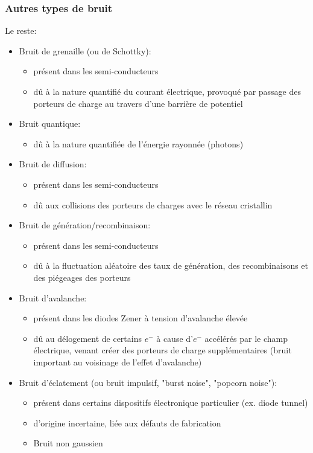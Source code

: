 \subsubsection{Autres types de bruit}
Le reste:
\begin{itemize}
	\item Bruit de grenaille (ou de Schottky):
	\begin{itemize}
		\item présent dans les semi-conducteurs
		\item dû à la nature quantifié du courant électrique, provoqué par passage des porteurs de charge au travers d'une barrière de potentiel
	\end{itemize}
	\item Bruit quantique:
	\begin{itemize}
		\item dû à la nature quantifiée de l'énergie rayonnée (photons)
	\end{itemize}
	\item Bruit de diffusion:
	\begin{itemize}
		\item présent dans les semi-conducteurs
		\item dû aux collisions des porteurs de charges avec le réseau cristallin
	\end{itemize}
	\item Bruit de génération/recombinaison:
	\begin{itemize}
		\item présent dans les semi-conducteurs
		\item  dû à la fluctuation aléatoire des taux de génération, des recombinaisons et des piégeages des porteurs
	\end{itemize}
	\item Bruit d'avalanche:
	\begin{itemize}
		\item présent dans les diodes Zener à tension d'avalanche élevée
		\item  dû au délogement de certains $e^-$ à cause d'$e^-$ accélérés par le champ électrique, venant créer des porteurs de charge supplémentaires (bruit important au voisinage de l'effet d'avalanche)
	\end{itemize}
	\item Bruit d'éclatement (ou bruit impulsif, "burst noise", "popcorn noise"):
	\begin{itemize}
		\item présent dans certains dispositifs électronique particulier (ex. diode tunnel)
		\item d'origine incertaine, liée aux défauts de fabrication
		\item Bruit non gaussien
	\end{itemize}
\end{itemize}
